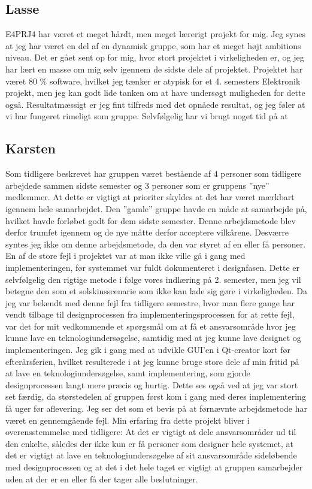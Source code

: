 \subsection{Lasse} 

E4PRJ4 har været et meget hårdt, men meget lærerigt projekt for mig. Jeg synes at jeg har været en del af en dynamisk gruppe, som har et meget højt ambitions niveau. Det er gået sent op for mig, hvor stort projektet i virkeligheden er, og jeg har lært en masse om mig selv igennem de sidste dele af projektet. Projektet har været 80 \% software, hvilket jeg tænker er atypisk for et 4. semesters Elektronik projekt, men jeg kan godt lide tanken om at have undersøgt muligheden for dette også. Resultatmæssigt er jeg fint tilfreds med det opnåede resultat, og jeg føler at vi har fungeret rimeligt som gruppe. Selvfølgelig har vi brugt noget tid på at 

\subsection{Karsten}
Som tidligere beskrevet har gruppen været bestående af 4 personer som tidligere arbejdede sammen sidste semester og 3 personer som er gruppens ''nye'' medlemmer. At dette er vigtigt at prioriter skyldes at det har været mærkbart igennem hele samarbejdet. Den ''gamle'' gruppe havde en måde at samarbejde på, hvilket havde forløbet godt for dem sidste semester. Denne arbejdsmetode blev derfor trumfet igennem og de nye måtte derfor acceptere vilkårene. Desværre syntes jeg ikke om denne arbejdsmetode, da den var styret af en eller få personer. En af de store fejl i projektet var at man ikke ville gå i gang med implementeringen, før systemmet var fuldt dokumenteret i designfasen. Dette er selvfølgelig den rigtige metode i følge vores indlæring på 2. semester, men jeg vil betegne den som et solskinsscenarie som ikke kan lade sig gøre i virkeligheden. Da jeg var bekendt med denne fejl fra tidligere semestre, hvor man flere gange har vendt tilbage til designprocessen fra implementeringsprocessen for at rette fejl, var det for mit vedkommende et spørgsmål om at få et ansvarsområde hvor jeg kunne lave en teknologiundersøgelse, samtidig med at jeg kunne lave designet og implementeringen. Jeg gik i gang med at udvikle GUI'en i Qt-creator kort før efterårsferien, hvilket resulterede i at jeg kunne bruge store dele af min fritid på at lave en teknologiundersøgelse, samt implementering, som gjorde designprocessen langt mere præcis og hurtig. Dette ses også ved at jeg var stort set færdig, da størstedelen af gruppen først kom i gang med deres implementering få uger før aflevering. Jeg ser det som et bevis på at førnævnte arbejdsmetode har været en gennemgående fejl. Min erfaring fra dette projekt bliver i overensstemmelse med tidligere: At det er vigtigt at dele ansvarsområder ud til den enkelte, således der ikke kun er få personer som designer hele systemet, at det er vigtigt at lave en teknologiundersøgelse af sit ansvarsområde sideløbende med designprocessen og at det i det hele taget er vigtigt at gruppen samarbejder uden at der er en eller få der tager alle beslutninger.    